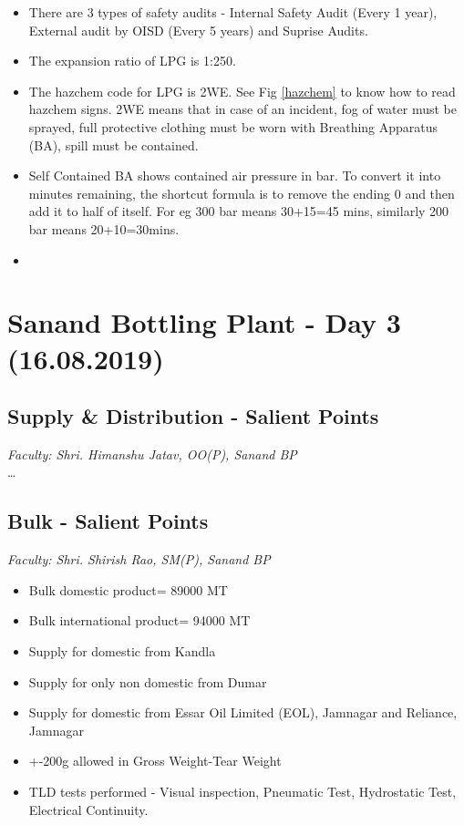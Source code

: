 \documentclass{report}
\begin{document}
\begin{itemize}
		\item There are 3 types of safety audits - Internal Safety Audit (Every 1 year), External audit by OISD (Every 5 years) and Suprise Audits.
		\item The expansion ratio of LPG is 1:250.
		\item The hazchem code for LPG is 2WE. See Fig \ref{hazchem} to know how to read hazchem signs. 2WE means that in case of an incident, fog of water must be sprayed, full protective clothing must be worn with Breathing Apparatus (BA), spill must be contained.
		\item Self Contained BA shows contained air pressure in bar. To convert it into minutes remaining, the shortcut formula is to remove the ending 0 and then add it to half of itself. For eg 300 bar means 30+15=45 mins, similarly 200 bar means 20+10=30mins.
		\item 
	\end{itemize}
	
	\section{Sanand Bottling Plant - Day 3 (16.08.2019)}
	
	\subsection{Supply \& Distribution - Salient Points}
	\textit{Faculty: Shri. Himanshu Jatav, OO(P), Sanand BP}\\
	\ldots
	
	\subsection{Bulk - Salient Points}
	\textit{Faculty: Shri. Shirish Rao, SM(P), Sanand BP}\\
	\begin{itemize}
		\item Bulk domestic product= 89000 MT
		\item Bulk international product= 94000 MT
		\item Supply for domestic from Kandla 
		\item Supply for only non domestic from Dumar
		\item Supply for domestic from Essar Oil Limited (EOL), Jamnagar and Reliance, Jamnagar
		\item +-200g allowed in Gross Weight-Tear Weight
		\item TLD tests performed - Visual inspection, Pneumatic Test, Hydrostatic Test, Electrical Continuity.
	\end{itemize}
	
\end{document}
